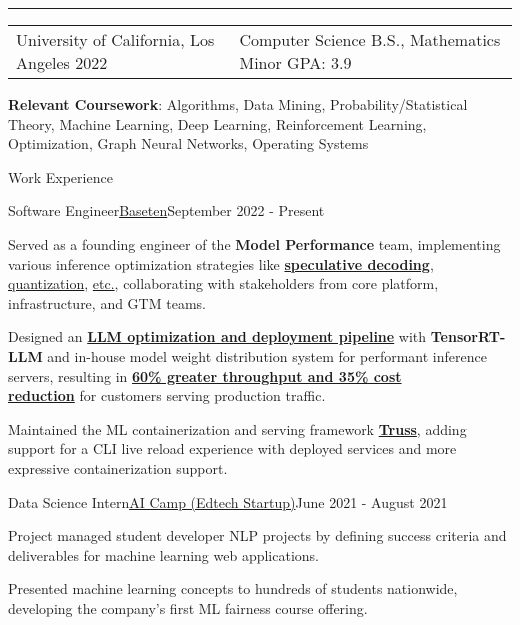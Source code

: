\documentclass{resume}
\begin{document}
\hrule
\begin{tabularx}{\textwidth}{YY}
    \raggedright University of California, Los Angeles 2022 & \raggedleft Computer Science B.S., Mathematics Minor GPA: 3.9
\end{tabularx}
\textbf{Relevant Coursework}: Algorithms, Data Mining, Probability/Statistical Theory, Machine Learning, Deep Learning, Reinforcement Learning, Optimization, Graph Neural Networks, Operating Systems

\begin{rSection}{Work Experience}
    \begin{rSubsection}{Software Engineer}{\href{https://www.baseten.co/}{Baseten}}{September 2022 - Present}
        \item Served as a founding engineer of the \textbf{Model Performance} team, implementing various inference optimization strategies like {\href{https://www.baseten.co/blog/how-we-built-production-ready-speculative-decoding-with-tensorrt-llm/}{\textbf{speculative decoding}}}, {\href{https://www.baseten.co/blog/33-faster-llm-inference-with-fp8-quantization/}{quantization}}, {\href{https://www.baseten.co/blog/driving-model-performance-optimization-2024-highlights/}{etc.}}, collaborating with stakeholders from core platform, infrastructure, and GTM teams. 
        \item Designed an {\href{https://www.baseten.co/blog/automatic-llm-optimization-with-tensorrt-llm-engine-builder/}{\textbf{LLM optimization and deployment pipeline}}} with \textbf{TensorRT-LLM} and in-house model weight distribution system for performant inference servers, resulting in {\href{https://www.baseten.co/customers/writer/}{\textbf{60\% greater throughput and 35\% cost \\ reduction}}} for customers serving production traffic.
        \item Maintained the ML containerization and serving framework {\href{https://github.com/basetenlabs/truss}{\textbf{Truss}}}, adding support for a CLI live reload experience with deployed services and more expressive containerization support.
    \end{rSubsection}
    \begin{rSubsection}{Data Science Intern}{\href{https://www.ai-camp.org/}{AI Camp (Edtech Startup)}}{June 2021 - August 2021}
        \item Project managed student developer NLP projects by defining success criteria and deliverables for machine learning web applications.
        \item Presented machine learning concepts to hundreds of students nationwide, developing the company's first ML fairness course offering.

\end{rSubsection}
\end{rSection}
\end{document}
